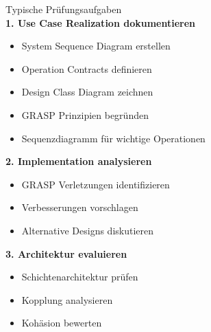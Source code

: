 \begin{KR}{Typische Prüfungsaufgaben}\\
\textbf{1. Use Case Realization dokumentieren}
\begin{itemize}
    \item System Sequence Diagram erstellen
    \item Operation Contracts definieren
    \item Design Class Diagram zeichnen
    \item GRASP Prinzipien begründen
    \item Sequenzdiagramm für wichtige Operationen
\end{itemize}

\textbf{2. Implementation analysieren}
\begin{itemize}
    \item GRASP Verletzungen identifizieren
    \item Verbesserungen vorschlagen
    \item Alternative Designs diskutieren
\end{itemize}

\textbf{3. Architektur evaluieren}
\begin{itemize}
    \item Schichtenarchitektur prüfen
    \item Kopplung analysieren
    \item Kohäsion bewerten
\end{itemize}
\end{KR}




